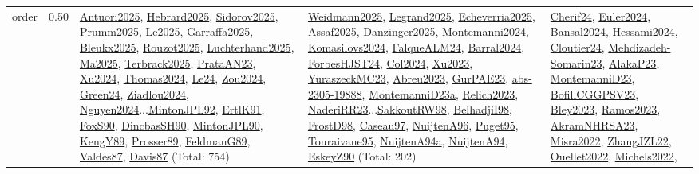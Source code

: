 {\begin{longtable}{p{3cm}r>{\raggedright\arraybackslash}p{6cm}>{\raggedright\arraybackslash}p{6cm}>{\raggedright\arraybackslash}p{8cm}}
\index{order}\index{Scheduling!order}order &  0.50 & \hyperref[detail:Antuori2025]{Antuori2025}, \hyperref[detail:Hebrard2025]{Hebrard2025}, \hyperref[detail:Sidorov2025]{Sidorov2025}, \hyperref[detail:Prumm2025]{Prumm2025}, \hyperref[detail:Le2025]{Le2025}, \hyperref[detail:Garraffa2025]{Garraffa2025}, \hyperref[detail:Bleukx2025]{Bleukx2025}, \hyperref[detail:Rouzot2025]{Rouzot2025}, \hyperref[detail:Luchterhand2025]{Luchterhand2025}, \hyperref[detail:Ma2025]{Ma2025}, \hyperref[detail:Terbrack2025]{Terbrack2025}, \hyperref[detail:PrataAN23]{PrataAN23}, \hyperref[detail:Xu2024]{Xu2024}, \hyperref[detail:Thomas2024]{Thomas2024}, \hyperref[detail:Le24]{Le24}, \hyperref[detail:Zou2024]{Zou2024}, \hyperref[detail:Green24]{Green24}, \hyperref[detail:Ziadlou2024]{Ziadlou2024}, \hyperref[detail:Nguyen2024]{Nguyen2024}...\hyperref[detail:MintonJPL92]{MintonJPL92}, \hyperref[detail:ErtlK91]{ErtlK91}, \hyperref[detail:FoxS90]{FoxS90}, \hyperref[detail:DincbasSH90]{DincbasSH90}, \hyperref[detail:MintonJPL90]{MintonJPL90}, \hyperref[detail:KengY89]{KengY89}, \hyperref[detail:Prosser89]{Prosser89}, \hyperref[detail:FeldmanG89]{FeldmanG89}, \hyperref[detail:Valdes87]{Valdes87}, \hyperref[detail:Davis87]{Davis87} (Total: 754) & \hyperref[detail:Weidmann2025]{Weidmann2025}, \hyperref[detail:Legrand2025]{Legrand2025}, \hyperref[detail:Echeverria2025]{Echeverria2025}, \hyperref[detail:Assaf2025]{Assaf2025}, \hyperref[detail:Danzinger2025]{Danzinger2025}, \hyperref[detail:Montemanni2024]{Montemanni2024}, \hyperref[detail:Komasilovs2024]{Komasilovs2024}, \hyperref[detail:FalqueALM24]{FalqueALM24}, \hyperref[detail:Barral2024]{Barral2024}, \hyperref[detail:ForbesHJST24]{ForbesHJST24}, \hyperref[detail:Col2024]{Col2024}, \hyperref[detail:Xu2023]{Xu2023}, \hyperref[detail:YuraszeckMC23]{YuraszeckMC23}, \hyperref[detail:Abreu2023]{Abreu2023}, \hyperref[detail:GurPAE23]{GurPAE23}, \hyperref[detail:abs-2305-19888]{abs-2305-19888}, \hyperref[detail:MontemanniD23a]{MontemanniD23a}, \hyperref[detail:Relich2023]{Relich2023}, \hyperref[detail:NaderiRR23]{NaderiRR23}...\hyperref[detail:SakkoutRW98]{SakkoutRW98}, \hyperref[detail:BelhadjiI98]{BelhadjiI98}, \hyperref[detail:FrostD98]{FrostD98}, \hyperref[detail:Caseau97]{Caseau97}, \hyperref[detail:NuijtenA96]{NuijtenA96}, \hyperref[detail:Puget95]{Puget95}, \hyperref[detail:Touraivane95]{Touraivane95}, \hyperref[detail:NuijtenA94a]{NuijtenA94a}, \hyperref[detail:NuijtenA94]{NuijtenA94}, \hyperref[detail:EskeyZ90]{EskeyZ90} (Total: 202) & \hyperref[detail:Cherif24]{Cherif24}, \hyperref[detail:Euler2024]{Euler2024}, \hyperref[detail:Bansal2024]{Bansal2024}, \hyperref[detail:Hessami2024]{Hessami2024}, \hyperref[detail:Cloutier24]{Cloutier24}, \hyperref[detail:Mehdizadeh-Somarin23]{Mehdizadeh-Somarin23}, \hyperref[detail:AlakaP23]{AlakaP23}, \hyperref[detail:MontemanniD23]{MontemanniD23}, \hyperref[detail:BofillCGGPSV23]{BofillCGGPSV23}, \hyperref[detail:Bley2023]{Bley2023}, \hyperref[detail:Ramos2023]{Ramos2023}, \hyperref[detail:AkramNHRSA23]{AkramNHRSA23}, \hyperref[detail:Misra2022]{Misra2022}, \hyperref[detail:ZhangJZL22]{ZhangJZL22}, \hyperref[detail:Ouellet2022]{Ouellet2022}, \hyperref[detail:Michels2022]{Michels2022}, 
\end{longtable}}

